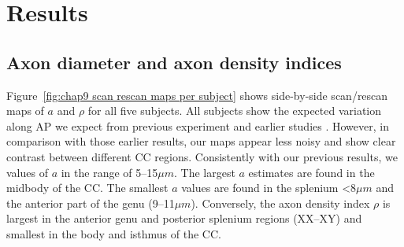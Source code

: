 \section{Results}
\subsection*{Axon diameter and axon density indices}
Figure~\ref{fig:chap9 scan rescan maps per subject} shows side-by-side scan/rescan maps of $a$ and $\rho$ for all five subjects. All subjects show the expected variation along AP we expect from  previous experiment and earlier studies \citep{Alexander:2010}. However, in comparison with those earlier results, our maps appear less noisy and show clear contrast between different CC regions. Consistently with our previous results, we values of $a$ in the range of 5--15$\mu m$. The largest $a$ estimates are found in the midbody of the CC. The smallest $a$ values are found in the splenium <8$\mu m$ and the anterior part of the genu (9--11$\mu m$). Conversely, the axon density index $\rho$ is largest in the anterior genu and posterior splenium regions  (XX--XY) and smallest in the body and isthmus of the CC. 

